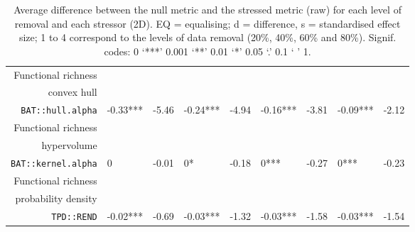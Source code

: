 \begin{table}[ht]
\begin{tabular}{rllllllll}
  Functional richness\\convex hull\\\texttt{BAT::hull.alpha} & -0.33*** & -5.46 & -0.24*** & -4.94 & -0.16*** & -3.81 & -0.09*** & -2.12 \\ 
  Functional richness\\hypervolume\\\texttt{BAT::kernel.alpha} & 0 & -0.01 & 0* & -0.18 & 0*** & -0.27 & 0*** & -0.23 \\ 
  Functional richness\\probability density\\\texttt{TPD::REND} & -0.02*** & -0.69 & -0.03*** & -1.32 & -0.03*** & -1.58 & -0.03*** & -1.54 \\ 
   \hline
\end{tabular}
\caption{Average difference between the null metric and the stressed metric (raw) for each level of removal and each stressor (2D). EQ = equalising; d = difference, s = standardised effect size; 1 to 4 correspond to the levels of data removal (20\%, 40\%, 60\% and 80\%). Signif. codes:  0 ‘***’ 0.001 ‘**’ 0.01 ‘*’ 0.05 ‘.’ 0.1 ‘ ’ 1.} 
\end{table}
